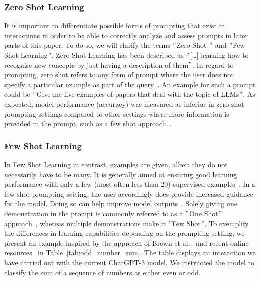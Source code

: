 
\subsubsection{Zero Shot Learning} %
It is important to differentiate possible forms of prompting that exist in interactions in order
to be able to correctly analyze and assess prompts in later parts of this paper.
To do so, we will clarify the terms \("\)Zero Shot \("\) and \("\)Few Shot Learning\("\).
Zero Shot Learning has been described as \("\)[\ldots] learning how to recognise
new concepts by just having a description of them\("\)\cite[p. 1]{feris_embarrassingly_2015}.
In regard to prompting, zero shot refers to any form of prompt where the user does not specify
a particular example as part of the query~\cite[p. 1]{dang_how_2022}.
An example for such a prompt could be \("\)Give me five examples of papers that deal with the topic
of LLMs\("\).
As expected, model performance (accuracy) was measured as inferior in zero shot prompting
settings compared
to other settings where more information is provided in the prompt, such as a few shot approach~\cite[p. 5]{brown_language_2020}.


\subsubsection{Few Shot Learning}
In Few Shot Learning in contrast, examples are given, albeit they do not necessarily have to be
many.
It is generally aimed at ensuring good learning performance with only a few (most often less than 20)
supervised examples~\cite[p. 1]{samuel_offline_2022}. %
In a few shot prompting setting, the user accordingly does provide increased guidance for the model.
Doing so can help improve model outputs~\cite[p. 1]{dang_how_2022}.
Solely giving one demonstration in the prompt is commonly referred to as a \("\)One Shot\("\)
approach~\cite[p. 6]{brown_language_2020},
whereas multiple demonstrations make it \("\)Few Shot\("\).
To exemplify the differences in learning capabilities depending on the prompting setting,
we present an example inspired by the approach of Brown et al\(.\)~\cite{brown_language_2020}
and recent online resources~\cite{dairai_few-shot_2023} in Table~\ref{tab:odd_number_sum}.
The table displays an interaction we have carried out with the current ChatGPT-3 model.
We instructed the model to classify the sum of a sequence of numbers as either even or odd.

